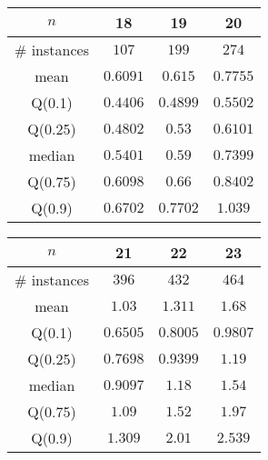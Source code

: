 \begin{tabular}{c|ccc} 
\hline 
$n$ & 18 & 19 & 20 \tabularnewline 
\hline 
\hline 
\# instances & $107$ & $199$ & $274$ \tabularnewline 
mean & $0.6091$ & $0.615$ & $0.7755$ \tabularnewline 
Q(0.1) & $0.4406$ & $0.4899$ & $0.5502$ \tabularnewline 
Q(0.25) & $0.4802$ & $0.53$ & $0.6101$ \tabularnewline 
median & $0.5401$ & $0.59$ & $0.7399$ \tabularnewline 
Q(0.75) & $0.6098$ & $0.66$ & $0.8402$ \tabularnewline 
Q(0.9) & $0.6702$ & $0.7702$ & $1.039$ \tabularnewline 
\hline 
\end{tabular} 
\medskip{} 

\begin{tabular}{c|ccc} 
\hline 
$n$ & 21 & 22 & 23 \tabularnewline 
\hline 
\hline 
\# instances & $396$ & $432$ & $464$ \tabularnewline 
mean & $1.03$ & $1.311$ & $1.68$ \tabularnewline 
Q(0.1) & $0.6505$ & $0.8005$ & $0.9807$ \tabularnewline 
Q(0.25) & $0.7698$ & $0.9399$ & $1.19$ \tabularnewline 
median & $0.9097$ & $1.18$ & $1.54$ \tabularnewline 
Q(0.75) & $1.09$ & $1.52$ & $1.97$ \tabularnewline 
Q(0.9) & $1.309$ & $2.01$ & $2.539$ \tabularnewline 
\hline 
\end{tabular} 
\medskip{} 

